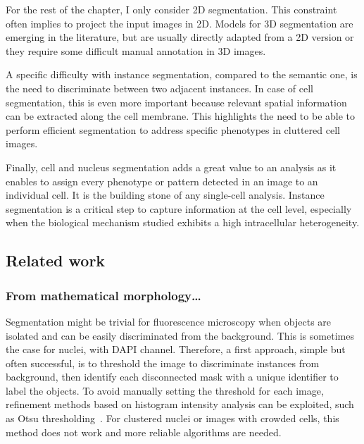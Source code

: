 For the rest of the chapter, I only consider 2D segmentation.
This constraint often implies to project the input images in 2D.
Models for 3D segmentation are emerging in the literature, but are usually directly adapted from a 2D version or they require some difficult manual annotation in 3D images.

A specific difficulty with instance segmentation, compared to the semantic one, is the need to discriminate between two adjacent instances.
In case of cell segmentation, this is even more important because relevant spatial information can be extracted along the cell membrane.
This highlights the need to be able to perform efficient segmentation to address specific phenotypes in cluttered cell images.

Finally, cell and nucleus segmentation adds a great value to an analysis as it enables to assign every phenotype or pattern detected in an image to an individual cell.
It is the building stone of any single-cell analysis.
Instance segmentation is a critical step to capture information at the cell level, especially when the biological mechanism studied exhibits a high intracellular heterogeneity.

\subsection{Related work}
\label{subsec:segmentation_related_work}

\subsubsection{From mathematical morphology\dots}

Segmentation might be trivial for fluorescence microscopy when objects are isolated and can be easily discriminated from the background.
This is sometimes the case for nuclei, with DAPI channel.
Therefore, a first approach, simple but often successful, is to threshold the image to discriminate instances from background, then identify each disconnected mask with a unique identifier to label the objects.
To avoid manually setting the threshold for each image, refinement methods based on histogram intensity analysis can be exploited, such as Otsu thresholding~\cite{Otsu_1979}.
For clustered nuclei or images with crowded cells, this method does not work and more reliable algorithms are needed.

